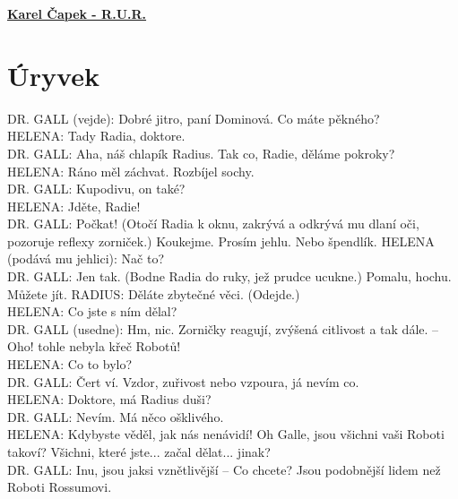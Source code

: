 \documentclass[11pt]{article}
\begin{document}
    \begin{center}
        \underline{\textbf{\Huge Karel Čapek - R.U.R.}}
    \end{center}
    \section*{Úryvek}
    DR. GALL (vejde): Dobré jitro, paní Dominová. Co máte pěkného? \\ HELENA: Tady Radia, doktore. \\ DR.  GALL:  Aha,  náš  chlapík  Radius.  Tak  co,  Radie,  děláme pokroky? \\ HELENA: Ráno měl záchvat. Rozbíjel sochy. \\ DR. GALL: Kupodivu, on také? \\ HELENA: Jděte, Radie! \\ DR.  GALL:  Počkat!  (Otočí  Radia  k  oknu,  zakrývá  a  odkrývá  mu dlaní  oči,  pozoruje  reflexy  zorniček.)  Koukejme.  Prosím  jehlu. Nebo špendlík. HELENA (podává mu jehlici): Nač to? \\ DR.  GALL:  Jen  tak.  (Bodne  Radia  do  ruky,  jež  prudce  ucukne.) Pomalu, hochu. Můžete jít. RADIUS: Děláte zbytečné věci. (Odejde.) \\ HELENA: Co jste s ním dělal? \\ DR.  GALL  (usedne):  Hm,  nic.  Zorničky  reagují,  zvýšená  citlivost  a tak dále. – Oho! tohle nebyla křeč Robotů! \\ HELENA: Co to bylo? \\ DR. GALL: Čert ví. Vzdor, zuřivost nebo vzpoura, já nevím co. \\ HELENA: Doktore, má Radius duši? \\ DR. GALL: Nevím. Má něco ošklivého. \\ HELENA: Kdybyste věděl, jak nás nenávidí! Oh Galle, jsou všichni vaši Roboti takoví? Všichni, které jste... začal dělat... jinak? \\ DR. GALL: Inu, jsou jaksi vznětlivější – Co chcete? Jsou podobnější lidem než Roboti Rossumovi. 
\end{document}
